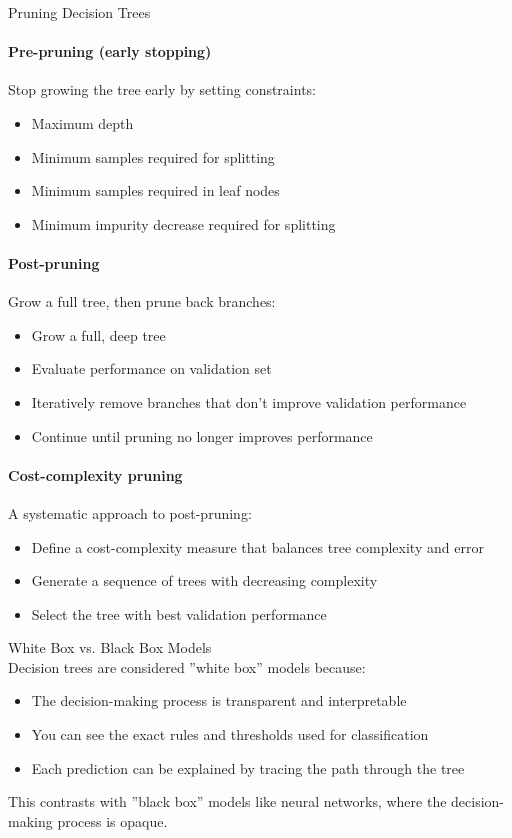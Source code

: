 \begin{KR}{Pruning Decision Trees}
\paragraph{Pre-pruning (early stopping)}
Stop growing the tree early by setting constraints:
\begin{itemize}
    \item Maximum depth
    \item Minimum samples required for splitting
    \item Minimum samples required in leaf nodes
    \item Minimum impurity decrease required for splitting
\end{itemize}

\paragraph{Post-pruning}
Grow a full tree, then prune back branches:
\begin{itemize}
    \item Grow a full, deep tree
    \item Evaluate performance on validation set
    \item Iteratively remove branches that don't improve validation performance
    \item Continue until pruning no longer improves performance
\end{itemize}

\paragraph{Cost-complexity pruning}
A systematic approach to post-pruning:
\begin{itemize}
    \item Define a cost-complexity measure that balances tree complexity and error
    \item Generate a sequence of trees with decreasing complexity
    \item Select the tree with best validation performance
\end{itemize}
\end{KR}

\begin{concept}{White Box vs. Black Box Models}\\
Decision trees are considered ''white box'' models because:
\begin{itemize}
    \item The decision-making process is transparent and interpretable
    \item You can see the exact rules and thresholds used for classification
    \item Each prediction can be explained by tracing the path through the tree
\end{itemize}
This contrasts with ''black box'' models like neural networks, where the decision-making process is opaque.
\end{concept}

